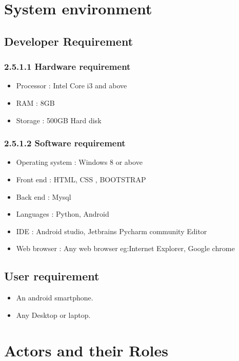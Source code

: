 \documentclass[a4paper,12pt,toc=flat]{report}
\begin{document}
{	\pagebreak
	\section{System environment} 
	\subsection{Developer Requirement}{
		
		\subsubsection{2.5.1.1 Hardware requirement}{
			\begin{itemize}
				\item Processor : Intel Core i3 and above
				\item  RAM : 8GB
				\item  Storage : 500GB Hard disk
			\end{itemize}
		}
		
		
		
		\subsubsection{2.5.1.2 Software requirement}{
			\begin{itemize}
				\item  Operating system : Windows 8 or above 
				\item  Front end : HTML, CSS , BOOTSTRAP
				\item  Back end : Mysql
					\item  Languages : Python, Android
				\item  IDE : Android studio, Jetbrains Pycharm community Editor
				\item  Web browser : Any web browser eg:Internet Explorer, Google chrome
			\end{itemize}
		}
		
		\subsection{User requirement}
		\begin{itemize}
			\item  An android smartphone.
			\item  Any Desktop or laptop.
	\end{itemize}}
	
	
	
	\pagebreak
	\section{Actors and their Roles}
	
}
\end{document}

